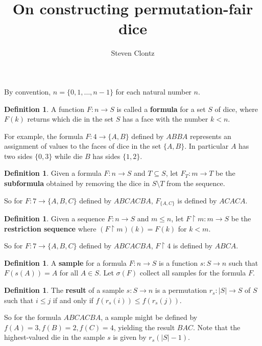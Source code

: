 \documentclass{article}
\title{On constructing permutation-fair dice}
\author{Steven Clontz}
\theoremstyle{definition}
\newtheorem{definition}[theorem]{Definition}
\newcommand{\rest}{\upharpoonright}
\newcommand{\term}{\textbf}
\begin{document}
\maketitle

By convention, \(n=\{0,1,\dots,n-1\}\) for each natural number \(n\).

\begin{definition}
    A function \(F:n\to S\) is called a \term{formula} for a 
    set \(S\) of dice, where \(F(k)\) returns which die in the set \(S\)
    has a face with the number \(k<n\).
\end{definition}

For example, the formula \(F:4\to\{A,B\}\) defined by \(ABBA\)
represents an assignment of values to the faces of dice in the set \(\{A,B\}\).
In particular \(A\) has two sides \(\{0,3\}\) while die \(B\) has sides \(\{1,2\}\).

\begin{definition}
    Given a formula \(F:n\to S\) and \(T\subseteq S\), let \(F_T:m\to T\) be the 
    \term{subformula} obtained by removing the dice in \(S\setminus T\) from the sequence.
\end{definition}

So for \(F:7\to\{A,B,C\}\) defined by \(ABCACBA\), \(F_{\{A,C\}}\) is defined by
\(ACACA\).

\begin{definition}
    Given a sequence \(F:n\to S\) and \(m\leq n\), let \(F\rest m:m\to S\) be the 
    \term{restriction sequence} where \((F\rest m)(k)=F(k)\) for \(k<m\).
\end{definition}

So for \(F:7\to\{A,B,C\}\) defined by \(ABCACBA\), \(F\rest 4\) is defined by
\(ABCA\).

\begin{definition}
    A \term{sample} for a formula \(F:n\to S\) is a function \(s:S\to n\) such
    that \(F(s(A))=A\) for all \(A\in S\). Let \(\sigma (F)\) collect
    all samples for the formula \(F\).
\end{definition}

\begin{definition}
    The \term{result} of a sample \(s:S\to n\) is a permutation \(r_s:|S|\to S\)
    of \(S\) such that \(i\leq j\) if and only if \(f(r_s(i))\leq f(r_s(j))\).
\end{definition}

So for the formula \(ABCACBA\), a sample might be defined
by \(f(A)=3,f(B)=2,f(C)=4\), yielding the result \(BAC\).
Note that the highest-valued die in the sample \(s\) is given by \(r_s(|S|-1)\).
\end{document}
